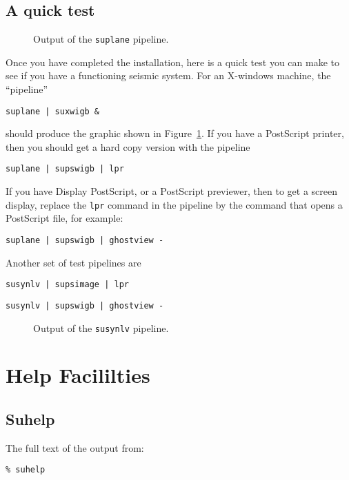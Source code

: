{{{{{{{\section{A quick test}
\begin{figure}
\epsfxsize 250pt
\centerline{}
\caption{Output of the \protect\verb:suplane: pipeline.}
\label{fig:suplane}
\end{figure}

Once you have completed the installation, here is a quick test you can make
to see if you have a functioning seismic system.
For an X-windows machine, the ``pipeline''
\begin{verbatim}
suplane | suxwigb &
\end{verbatim}
should produce the graphic shown in Figure~\ref{fig:suplane}. 
If you have a PostScript printer, then you should get a hard copy version
with the pipeline
\begin{verbatim}
suplane | supswigb | lpr
\end{verbatim}
If you have Display PostScript, or a PostScript previewer, then to get
a screen display, replace the \verb:lpr: command in the pipeline by
the command that opens a PostScript file, for example:
\begin{verbatim}
suplane | supswigb | ghostview -
\end{verbatim}

Another set of test pipelines are
\begin{verbatim}
susynlv | supsimage | lpr
\end{verbatim}
\begin{verbatim}
susynlv | supswigb | ghostview -
\end{verbatim}

\begin{figure}
\epsfxsize 300pt
\centerline{}
\caption{Output of the \protect\verb:susynlv: pipeline.}
\label{fig:susynlv}
\end{figure}

\chapter{Help Facililties \label{app:B}}
\section{Suhelp}
The full text of the output from:
\begin{verbatim}
% suhelp
\end{verbatim} \noindent

}}}}}}}
